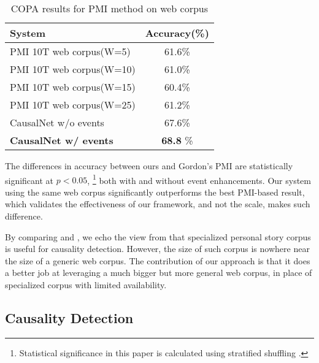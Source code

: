 \begin{table}[th]
\centering
\caption{COPA results for PMI method on web corpus}
\label{tab:baseline}
\begin{tabular}{lc}
\hline
System & Accuracy(\%) \\
\hline
PMI 10T web corpus(W=5) & 61.6\% \\
PMI 10T web corpus(W=10) & 61.0\% \\
PMI 10T web corpus(W=15) & 60.4\% \\
PMI 10T web corpus(W=25) & 61.2\% \\
\hline
CausalNet w/o events & 67.6\%  \\
{\bf CausalNet w/ events} & {\bf 68.8} \%   \\
\hline
\end{tabular}
\end{table}

The differences in accuracy between ours and Gordon's PMI are
statistically significant at $p<0.05$, \footnote{Statistical
significance in this paper is calculated using stratified shuffling
\cite{resampling1989computer}.} both with and without event
enhancements. Our system using the same web corpus significantly
outperforms the best PMI-based result, which validates the
effectiveness of our framework, and not the scale, makes such
difference.

By comparing  and ,
we echo the view from \cite{gordon2011commonsense} that specialized
personal story corpus is useful for causality detection.
However, the size of such corpus is nowhere near the size of a generic
web corpus.
The contribution of our approach is that it does a better job at
leveraging a much bigger but more general web
corpus, in place of specialized corpus with limited availability.

%
%

\subsection{Causality Detection}

